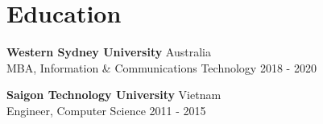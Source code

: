 \documentclass[10pt]{article}
\begin{document}
\section{Education}
\textbf{Western Sydney University} \hfill Australia \\
MBA, Information \& Communications Technology \hfill 2018 - 2020

\vspace{4pt}

\textbf{Saigon Technology University} \hfill Vietnam \\
Engineer, Computer Science \hfill 2011 - 2015
\end{document}
